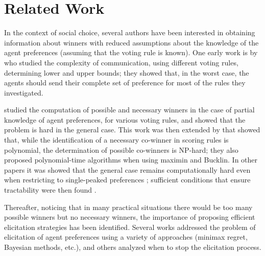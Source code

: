 \documentclass[sigconf, anonymous]{aamas}
\begin{document}
\section{Related Work}
\label{sec:related}
In the context of social choice, several authors have been interested in obtaining information about winners with reduced assumptions about the knowledge of the agent preferences (assuming that the voting rule is known). One early work is  by  who studied the complexity of communication, using different voting rules, determining lower and upper bounds; they showed that, in the worst case, the agents should send their complete set of preference for most of the rules they investigated. 

 studied the computation of possible and necessary winners in the case of partial knowledge of agent preferences, for various voting rules, and showed that the problem is hard in the general case.
This work was then extended by \citet{Xia2008} that showed that, while the identification of a necessary co-winner in scoring rules is polynomial,  the determination of possible co-winners is NP-hard; they also  proposed polynomial-time algorithms when using maximin and Bucklin.
In other papers it was showed that the general case remains computationally hard even when restricting to single-peaked preferences \citep{Walsh2007};  sufficient conditions that ensure tractability were then found \citep{Pini2007}.


Thereafter, noticing that in many practical situations there would be too many possible winners but no necessary winners, the importance of proposing efficient elicitation strategies has been identified. 
Several works addressed the problem of  elicitation of agent preferences \citep{Naamani-Dery2015,Kalech2011,Lu2011,Pini2009,Benabbou2016,Dey2016,Dey2016_2} using a variety of approaches (minimax regret, Bayesian methods, etc.), and others \citep{Walsh2009,Conitzer2009}  analyzed when to stop the elicitation process.
\end{document}
